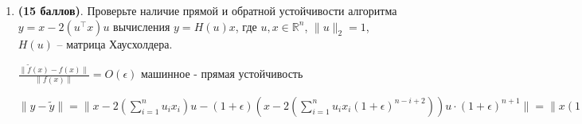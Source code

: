 \documentclass[a4paper, 11pt]{article}
\newcommand{\prob}[1]{\item \textbf{(#1 баллов)}.}
\begin{document}
\begin{enumerate}
			Наивный алгоритм имеет сложность $2^{3q + 1} + O(2^{2q})$ для матрицы порядка $2^q$
			
			У Штрассена умножений будет $M(n) = 7 M(\frac{n}{2})$ - рекуррента.
			
			Сложений $A(n) = 7(\frac{n}{2})	 + 18A(\frac{n}{2})^2$
			
			Теория с лекций кончилась - пора решать:
			
			посчитаем число операций у Штрассена на $i"=$ой итерации
			
			$M(2^q) = 7^i \cdot 2^{3(q - i)}$
			
			$\displaystyle A(2^q) = 7^i A(2^{q - i}) + 18 \sum_{j = 1}^{i} 7^{j - 1} \cdot 2^{2(q - j)} $
			
			$\displaystyle \sum_{j = 1}^{i} 7^{j - 1} \cdot 2^{2(q - j)} = 2^{2(q - i) - 1} \cdot \frac{7^i}{3} - \frac{2^{2q - 1}}{3}$
			
			$A(2^q) = 7^i \cdot 2^{3(q - i)} - 7^i \cdot 2^{2(q - i)} - \frac{2^{2q}}{6} + \frac{7^i 2^{2(q - i)}}{6} = 7^i 2^{3(q - i)} + O(2^{2q})$
			
			Смотрим отношение:
			
			$\displaystyle \frac{7^i \cdot 2^{3 (q - i) + 1}}{2^{3q + 1}} = 7^i \cdot 2^{-3i} \leqslant 10^{-1}$
			
			$\frac{7^i}{8^i} \leqslant 10^{-1}$
			
			$i = 18$
			
			при 18 будет выполняться неравенство, 17 еще не хватит.
		
		\prob{15} Проверьте наличие прямой и обратной устойчивости алгоритма $y = x - 2(u^\top x) u$ вычисления $y = H(u) x$, где $u,x\in\mathbb{R}^{n}$, $\|u\|_2=1$, $H(u)$ -- матрица Хаусхолдера. 
		
			$\frac{\|\tilde{f}(x) - f(x)\|}{\|f(x)\|} = O(\epsilon)$ машинное - прямая устойчивость 
			
			$\displaystyle \|y - \tilde{y}\| = \|x - 2(\sum_{i = 1}^{n} u_i x_i )u - (1 + \epsilon)(x - 2(\sum_{i = 1}^{n} u_i x_i (1 + \epsilon)^{n - i + 2}) )u \cdot (1 + \epsilon)^{n + 1}\| = \|x(1 - l + \epsilon) - 2\sum_{i = 1}^{n} u_i x_i u + 2 \sum_{i = 1}^{n} u_i x_i (1 + \epsilon)^{n - i + 2} u (1 + \epsilon)^{n + 2}\| = \|\epsilon x  - 2(\sum_{i = 1}^{n} u_i x_i (1 - (1 + \epsilon)^{2n - i + 4}))u \| \leqslant \|\epsilon x\| + 2 \sum_{i = 1}^{n} |u_i| \cdot |x_i| \cdot |\epsilon (2n - i + 4) + O(\epsilon_{machine}^2)| \cdot \|u\| \leqslant \epsilon_{machine} \|x\| + (2n + 4 ) \epsilon_{machine} (\sum_{j = 1}^{n} |u_j| |x_j|) \|u\| + o(\epsilon^2_{machine}) $
			

\end{enumerate}
\end{document}
